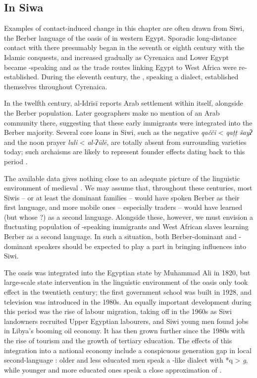 \documentclass[output=paper]{langsci/langscibook}
\begin{document}
 
 \subsection{In Siwa}


Examples of contact-induced change in this chapter are often drawn from Siwi, the Berber language of the oasis of  in western Egypt. Sporadic long-distance contact with  there presumably began in the seventh or eighth century with the Islamic conquests, and increased gradually as Cyrenaica and Lower Egypt became -speaking and as the trade routes linking Egypt to West Africa were re-established.  During the eleventh century, the , speaking a   dialect, established themselves throughout Cyrenaica.

In the twelfth century, al-Idrīsī reports Arab settlement within  itself, alongside the Berber population. Later geographers make no mention of an Arab community there, suggesting that these early immigrants were integrated into the Berber majority. Several core  loans in Siwi, such as the negative  \textit{qačči} < \textit{qaṭṭ} \textit{šayʔ} and the noon prayer \textit{luli} < \textit{al-ʔūlē}, are totally absent from surrounding  varieties today; such archaisms are likely to represent founder effects dating back to this period \citep{Souag2009}.  

The available data gives nothing close to an adequate picture of the linguistic environment of medieval . We may assume that, throughout these centuries, most Siwis – or at least the dominant families – would have spoken Berber as their first language, and more mobile ones – especially traders – would have learned  (but whose ?) as a second language. Alongside these, however, we must envision a fluctuating population of -speaking immigrants and West African slaves learning Berber as a second language. In such a situation, both Berber-dominant and -dominant speakers should be expected to play a part in bringing  influences into Siwi.

The oasis was integrated into the Egyptian state by Muhammad Ali in 1820, but large-scale state intervention in the linguistic environment of the oasis only took effect in the twentieth century; the first government school was built in 1928, and television was introduced in the 1980s. An equally important development during this period was the rise of labour migration, taking off in the 1960s as Siwi landowners recruited Upper Egyptian labourers, and Siwi young men found jobs in Libya's booming oil economy. It has then grown further since the 1980s with the rise of tourism and the growth of tertiary education. The effects of this integration into a national economy include a conspicuous generation gap in local second-language : older and less educated men speak a -like dialect with *q > \textit{g}, while younger and more educated ones speak a close approximation of  .
\end{document}
